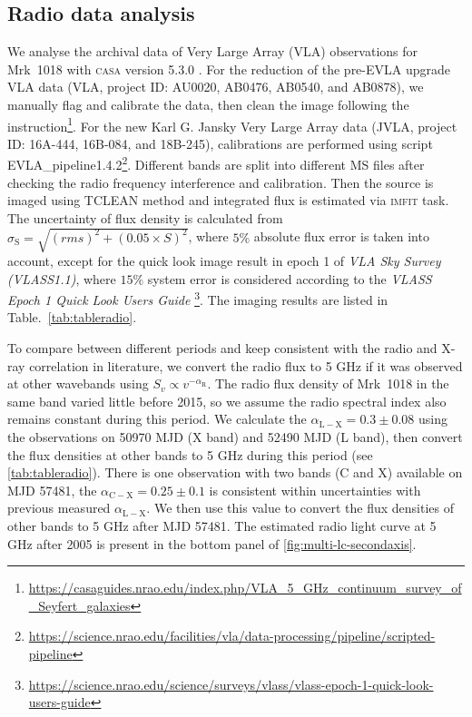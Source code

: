 \subsection{Radio data analysis}
\label{subsec:vla}
We analyse the archival data of Very Large Array (VLA) observations for Mrk~1018 with \textsc{casa} version 5.3.0 \citep{2007ASPC..376..127M}. For the reduction of the pre-EVLA upgrade VLA data (VLA, project ID: AU0020, AB0476, AB0540, and AB0878), we manually flag and calibrate the data, then clean the image following the instruction\footnote{\url{https://casaguides.nrao.edu/index.php/VLA_5_GHz_continuum_survey_of_Seyfert_galaxies}}. For the new Karl G. Jansky Very Large Array data (JVLA, project ID: 16A-444, 16B-084, and 18B-245), calibrations are performed using script {EVLA\_pipeline1.4.2}\footnote{\url{https://science.nrao.edu/facilities/vla/data-processing/pipeline/scripted-pipeline}}. Different bands are split into different MS files after checking the radio frequency interference and calibration. Then the source is imaged using {\scriptsize TCLEAN} method and integrated flux is estimated via \textsc{imfit} task. The uncertainty of flux density is calculated from $\sigma_\mathrm{S}=\sqrt{(rms)^2+(0.05\times S)^2}$, where $5 \%$ absolute flux error is taken into account, except for the quick look image result in epoch 1 of {\em VLA Sky Survey (VLASS1.1)}, where $15 \%$ system error is considered according to the {\em VLASS Epoch 1 Quick Look Users Guide} \footnote{\url{https://science.nrao.edu/science/surveys/vlass/vlass-epoch-1-quick-look-users-guide}}. The imaging results are listed in Table.~\ref{tab:tableradio}. 


To compare between different periods and keep consistent with the radio and X-ray correlation in literature, we convert the radio flux to 5 GHz if it was observed at other wavebands using $S_v \propto v^{-\alpha_\mathrm{R}}$. The radio flux density of Mrk~1018 in the same band varied little before 2015, so we assume the radio spectral index also remains constant during this period. We calculate the $\alpha_\mathrm{L-X} =0.3 \pm 0.08$ using the observations on 50970 MJD (X band) and 52490 MJD (L band), then convert the flux densities at other bands to 5 GHz during this period (see \autoref{tab:tableradio}). There is one observation with two bands (C and X) available on MJD 57481, the $\alpha_\mathrm{C-X} =0.25\pm0.1$ is consistent within uncertainties with previous measured $\alpha_\mathrm{L-X}$. We then use this value to convert the flux densities of other bands to 5 GHz after MJD 57481. The estimated radio light curve at 5 GHz after 2005 is present in the bottom panel of \autoref{fig:multi-lc-secondaxis}.

